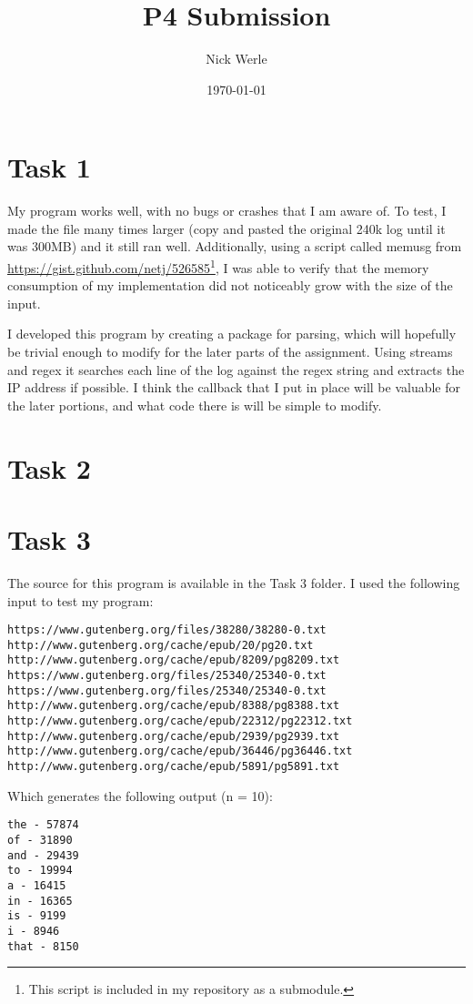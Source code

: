 \documentclass[11pt]{article}
\title{P4 Submission}
\author{Nick Werle}
\date{\today}
\begin{document}
	\maketitle
	\section{Task 1}
	My program works well, with no bugs or crashes that I am aware of. To test, I made the file many times larger (copy and pasted the original 240k log until it was 300MB) and it still ran well. Additionally, using a script called memusg from \url{https://gist.github.com/netj/526585}\footnote{This script is included in my repository as a submodule.}, I was able to verify that the memory consumption of my implementation did not noticeably grow with the size of the input.
	
	I developed this program by creating a package for parsing, which will hopefully be trivial enough to modify for the later parts of the assignment. Using streams and regex it searches each line of the log against the regex string and extracts the IP address if possible. I think the callback that I put in place will be valuable for the later portions, and what code there is will be simple to modify.
	\section{Task 2}
	\section{Task 3}
	The source for this program is available in the Task 3 folder. I used the following input to test my program:
\begin{verbatim}
https://www.gutenberg.org/files/38280/38280-0.txt
http://www.gutenberg.org/cache/epub/20/pg20.txt
http://www.gutenberg.org/cache/epub/8209/pg8209.txt
https://www.gutenberg.org/files/25340/25340-0.txt
https://www.gutenberg.org/files/25340/25340-0.txt
http://www.gutenberg.org/cache/epub/8388/pg8388.txt
http://www.gutenberg.org/cache/epub/22312/pg22312.txt
http://www.gutenberg.org/cache/epub/2939/pg2939.txt
http://www.gutenberg.org/cache/epub/36446/pg36446.txt
http://www.gutenberg.org/cache/epub/5891/pg5891.txt
\end{verbatim}
Which generates the following output (n = 10):
\begin{verbatim}
the - 57874
of - 31890
and - 29439
to - 19994
a - 16415
in - 16365
is - 9199
i - 8946
that - 8150
\end{verbatim}
\end{document}

